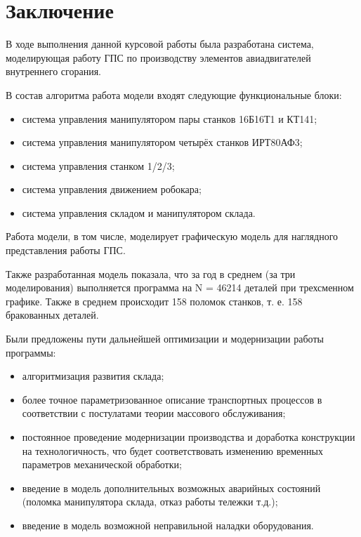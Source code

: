\section*{Заключение}

В ходе выполнения данной курсовой работы была разработана система, моделирующая работу ГПС по производству элементов авиадвигателей внутреннего сгорания. 

В состав алгоритма работа модели входят следующие функциональные блоки:

\begin{itemize}
    \item система управления манипулятором пары станков 16Б16Т1 и КТ141;
    \item система управления манипулятором четырёх станков ИРТ80АФ3;
    \item система управления станком 1/2/3;
    \item система управления движением робокара;
    \item система управления складом и манипулятором склада.
\end{itemize}

Работа модели, в том числе, моделирует графическую модель для наглядного представления работы ГПС.

Также разработанная модель показала, что за год в среднем (за три моделирования) выполняется программа на N = 46214 деталей при трехсменном графике. Также в среднем происходит 158 поломок станков, т. е. 158 бракованных деталей.

Были предложены пути дальнейшей оптимизации и модернизации работы программы:

\begin{itemize}
    \item алгоритмизация развития склада;
    \item более точное параметризованное описание транспортных процессов в соответствии с постулатами теории массового обслуживания;
    \item постоянное проведение модернизации производства и доработка конструкции на технологичность, что будет соответствовать изменению временных параметров механической обработки;
    \item введение в модель дополнительных возможных аварийных состояний (поломка манипулятора склада, отказ работы тележки т.д.);
    \item введение в модель возможной неправильной наладки оборудования.
\end{itemize}


